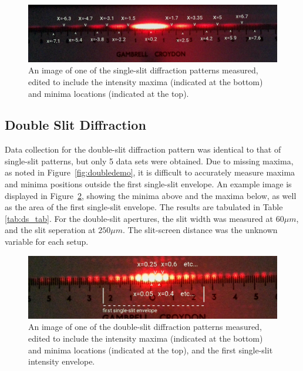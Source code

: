 \documentclass[a4paper]{article}
\begin{document}
\begin{figure}[ht!]
  \centerline{\includegraphics[scale=0.6]{q2sa3.png}}
  \captionsetup{justification=centering}
  \caption{An image of one of the single-slit diffraction patterns measured, edited to include the intensity maxima (indicated at the bottom) and minima locations (indicated at the top).}
  \label{fig:ss_measurement}
\end{figure}

\subsection{Double Slit Diffraction}

Data collection for the double-slit diffraction pattern was identical to that of single-slit patterns, but only 5 data sets were obtained. Due to missing maxima, as noted in Figure~\ref{fig:doubledemo}, it is difficult to accurately measure maxima and minima positions outside the first single-slit envelope. An example image is displayed in Figure~\ref{fig:ds_measurement}, showing the minima above and the maxima below, as well as the area of the first single-slit envelope. The results are tabulated in Table \ref{tab:ds_tab}. For the double-slit apertures, the slit width was measured at $60\mu m$, and the slit seperation at $250\mu m$. The slit-screen distance was the unknown variable for each setup.
\clearpage
\begin{figure}[h]
  \centerline{\includegraphics[scale=0.8]{q4ds1.png}}
  \captionsetup{justification=centering}
  \caption{An image of one of the double-slit diffraction patterns measured, edited to include the intensity maxima (indicated at the bottom) and minima locations (indicated at the top), and the first single-slit intensity envelope.}
  \label{fig:ds_measurement}
\end{figure}
\end{document}
